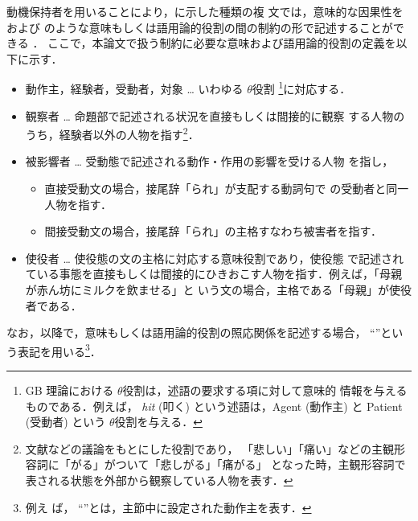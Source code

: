 動機保持者を用いることにより，に示した種類の複
文では，意味的な因果性をおよび のような意味もしくは語用論的役割の間の制約の形で記述することができる
\cite{中川:複文の意味論,COLING94}．
ここで，本論文で扱う制約に必要な意味および語用論的役割の定義を以下に示す．

\begin{itemize}
        \item 動作主，経験者，受動者，対象 … いわゆる $\theta$役割
\footnote{GB 理論における $\theta$役割は，述語の要求する項に対して意味的
情報を与えるものである\cite{Sells:ContemporarySyntacticTheories}．例えば，
{\it hit} (叩く) という述語は，Agent (動作主) と Patient (受動者) という 
$\theta$役割を与える．}に対応する．
        \item 観察者 … 命題部で記述される状況を直接もしくは間接的に観察
する人物のうち，経験者以外の人物を指す\footnote{文献\cite{斎藤:心情述語
の語用論的分析,大江:日英語の比較研究}などの議論をもとにした役割であり，
「悲しい」「痛い」などの主観形容詞に「がる」がついて「悲しがる」「痛がる」
となった時，主観形容詞で表される状態を外部から観察している人物を表す．}．
        \item 被影響者 … 受動態で記述される動作・作用の影響を受ける人物
を指し，
        \begin{itemize}
                \item 直接受動文の場合，接尾辞「られ」が支配する動詞句で
の受動者と同一人物を指す．
        \item 間接受動文の場合，接尾辞「られ」の主格すなわち被害者を指す．
\end{itemize}
        \item 使役者 … 使役態の文の主格に対応する意味役割であり，使役態
で記述されている事態を直接もしくは間接的にひきおこす人物を指す\cite{寺村:
日本語のシンタクスと意味1}．例えば，「母親が赤ん坊にミルクを飲ませる」と
いう文の場合，主格である「母親」が使役者である．
\end{itemize}
なお，以降で，意味もしくは語用論的役割の照応関係を記述する場合， 
``''という表記を用いる\footnote{例え
ば， ``''とは，主節中に設定された動作主を表す．}．
